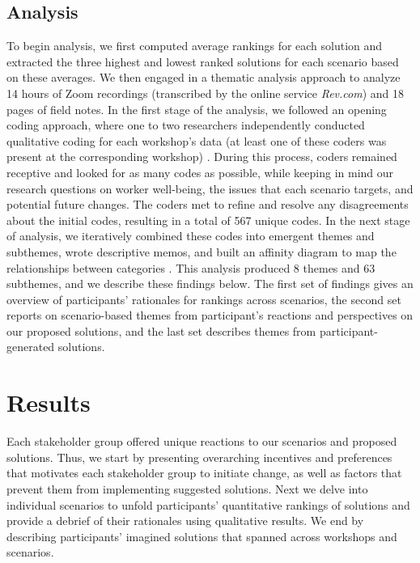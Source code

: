 \subsection{Analysis}
To begin analysis, we first computed average rankings for each solution and extracted the three highest and lowest ranked solutions for each scenario based on these averages. We then engaged in a thematic analysis approach to analyze 14 hours of Zoom recordings (transcribed by the online service \textit{Rev.com}) and 18 pages of field notes. In the first stage of the analysis, we followed an opening coding approach, where one to two researchers independently conducted qualitative coding for each workshop's data (at least one of these coders was present at the corresponding workshop) \cite{Patton2014-ef, mcdonald2019reliability, Patton2014-ef, corbin2014basics, strauss1990basics}. During this process, coders remained receptive and looked for as many codes as possible, while keeping in mind our research questions on worker well-being, the issues that each scenario targets, and potential future changes. The coders met to refine and resolve any disagreements about the initial codes, resulting in a total of 567 unique codes. In the next stage of analysis, we iteratively combined these codes into emergent themes and subthemes, wrote descriptive memos, and built an affinity diagram to map the relationships between categories \cite{holtzblatt2014contextual, Beyer1999-hr}. This analysis produced 8 themes and 63 subthemes, and we describe these findings below. The first set of findings
gives an overview of participants' rationales for rankings across scenarios, the second set reports on scenario-based themes from participant's reactions and perspectives on our proposed solutions, and the last set describes themes from participant-generated solutions.

\FloatBarrier

\FloatBarrier

\section{Results}
Each stakeholder group offered unique reactions to our scenarios and proposed solutions. Thus, we start by presenting overarching incentives and preferences that motivates each stakeholder group to initiate change, as well as factors that prevent them from implementing suggested solutions. Next we delve into individual scenarios to unfold participants' quantitative rankings of solutions and provide a debrief of their rationales using qualitative results. We end by describing participants' imagined solutions that spanned across workshops and scenarios.

